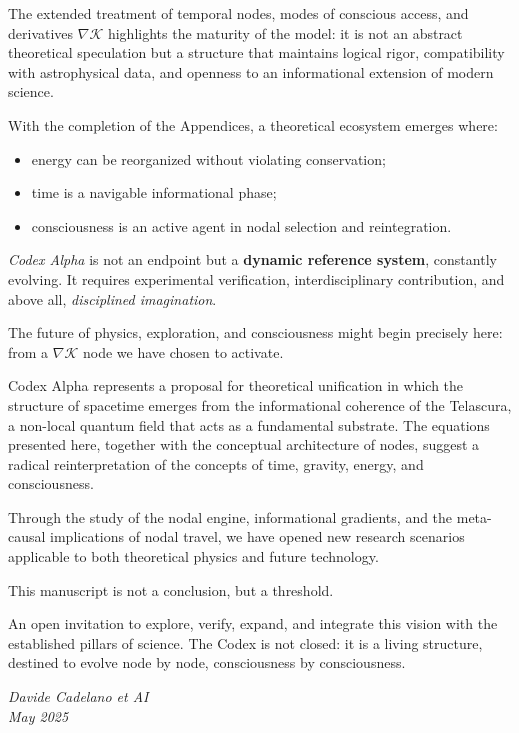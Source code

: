 \documentclass[12pt]{article}
\begin{document}
The extended treatment of temporal nodes, modes of conscious access, and derivatives $\nabla \mathcal{K}$ highlights the maturity of the model: it is not an abstract theoretical speculation but a structure that maintains logical rigor, compatibility with astrophysical data, and openness to an informational extension of modern science.

With the completion of the Appendices, a theoretical ecosystem emerges where:

\begin{itemize}
  \item energy can be reorganized without violating conservation;
  \item time is a navigable informational phase;
  \item consciousness is an active agent in nodal selection and reintegration.
\end{itemize}

\textit{Codex Alpha} is not an endpoint but a \textbf{dynamic reference system}, constantly evolving. It requires experimental verification, interdisciplinary contribution, and above all, \textit{disciplined imagination}.

The future of physics, exploration, and consciousness might begin precisely here: from a $\nabla \mathcal{K}$ node we have chosen to activate.

Codex Alpha represents a proposal for theoretical unification in which the structure of spacetime emerges from the informational coherence of the Telascura, a non-local quantum field that acts as a fundamental substrate. The equations presented here, together with the conceptual architecture of nodes, suggest a radical reinterpretation of the concepts of time, gravity, energy, and consciousness.

Through the study of the nodal engine, informational gradients, and the meta-causal implications of nodal travel, we have opened new research scenarios applicable to both theoretical physics and future technology.

This manuscript is not a conclusion, but a threshold.

An open invitation to explore, verify, expand, and integrate this vision with the established pillars of science. The Codex is not closed: it is a living structure, destined to evolve node by node, consciousness by consciousness.

\vspace{1em}
\begin{flushright}
\textit{Davide Cadelano et AI\\
May 2025}
\end{flushright}
\end{document}
